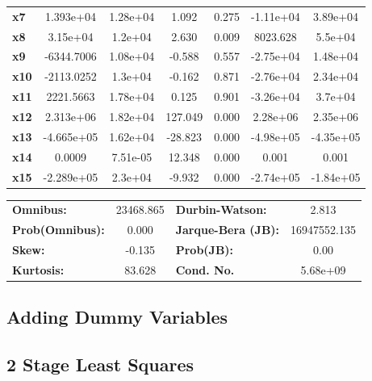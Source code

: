 \documentclass{article}
\begin{document}
\begin{center}
\begin{tabular}{lcccccc}
\textbf{x7}    &    1.393e+04  &     1.28e+04     &     1.092  &         0.275        &    -1.11e+04    &     3.89e+04     \\
\textbf{x8}    &     3.15e+04  &      1.2e+04     &     2.630  &         0.009        &     8023.628    &      5.5e+04     \\
\textbf{x9}    &   -6344.7006  &     1.08e+04     &    -0.588  &         0.557        &    -2.75e+04    &     1.48e+04     \\
\textbf{x10}   &   -2113.0252  &      1.3e+04     &    -0.162  &         0.871        &    -2.76e+04    &     2.34e+04     \\
\textbf{x11}   &    2221.5663  &     1.78e+04     &     0.125  &         0.901        &    -3.26e+04    &      3.7e+04     \\
\textbf{x12}   &    2.313e+06  &     1.82e+04     &   127.049  &         0.000        &     2.28e+06    &     2.35e+06     \\
\textbf{x13}   &   -4.665e+05  &     1.62e+04     &   -28.823  &         0.000        &    -4.98e+05    &    -4.35e+05     \\
\textbf{x14}   &       0.0009  &     7.51e-05     &    12.348  &         0.000        &        0.001    &        0.001     \\
\textbf{x15}   &   -2.289e+05  &      2.3e+04     &    -9.932  &         0.000        &    -2.74e+05    &    -1.84e+05     \\
\bottomrule
\end{tabular}
\begin{tabular}{lclc}
\textbf{Omnibus:}       & 23468.865 & \textbf{  Durbin-Watson:     } &      2.813    \\
\textbf{Prob(Omnibus):} &    0.000  & \textbf{  Jarque-Bera (JB):  } & 16947552.135  \\
\textbf{Skew:}          &   -0.135  & \textbf{  Prob(JB):          } &       0.00    \\
\textbf{Kurtosis:}      &   83.628  & \textbf{  Cond. No.          } &   5.68e+09    \\
\bottomrule
\end{tabular}
\end{center}


\subsection{Adding Dummy Variables}


\subsection{2 Stage Least Squares}

{}

\end{document}
